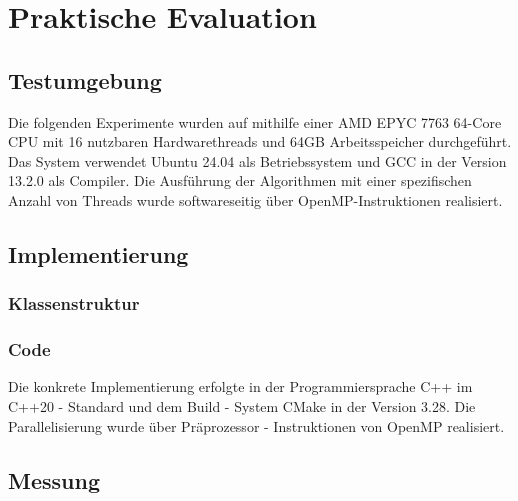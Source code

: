 \chapter{Praktische Evaluation}

\section{Testumgebung}
Die folgenden Experimente wurden auf mithilfe einer AMD EPYC 7763 64-Core CPU mit 16 nutzbaren Hardwarethreads und 64GB Arbeitsspeicher durchgeführt. Das System
verwendet Ubuntu 24.04 als Betriebssystem und GCC in der Version 13.2.0 als Compiler. Die Ausführung der Algorithmen mit einer spezifischen Anzahl von Threads wurde
softwareseitig über OpenMP-Instruktionen realisiert. 

\section{Implementierung}

\subsection{Klassenstruktur}

\subsection{Code}
Die konkrete Implementierung erfolgte in der Programmiersprache C++ im C++20 - Standard und dem Build - System CMake in der Version 3.28. Die Parallelisierung wurde
über Präprozessor - Instruktionen von OpenMP realisiert.

\section{Messung}

